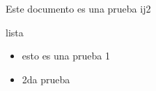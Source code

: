 \documentclass[10pt,letterpaper,final]{article}
\begin{document}
Este documento es una prueba ij2


\begin{frame}{lista}
\begin{itemize}
   \item esto es una prueba 1
   \item 2da prueba
\end{itemize}
\end{frame}
\end{document}
